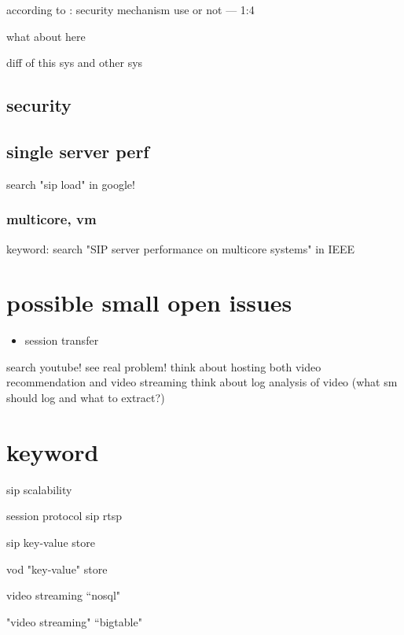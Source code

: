 \documentclass[•]{article}
\begin{document}
according to \cite{Nahum2007}:
security mechanism use or not — 1:4

what about here

diff of this sys and other sys

\subsection{security}

\subsection{single server perf}

search "sip load" in google!

\subsubsection{multicore, vm}
keyword: search "SIP server performance on multicore systems" in IEEE

\section{possible small open issues}
\begin{itemize}
\item session transfer
\end{itemize}

search youtube! see real problem!
think about hosting both video recommendation and video streaming
think about log analysis of video (what sm should log and what to extract?)



\section{keyword}

sip scalability

session protocol sip rtsp

sip key-value store

vod "key-value" store

video streaming “nosql"

"video streaming" “bigtable"





\cite{Nahum2007}\cite{Shen2010}\cite{Vaquero2011}\cite{Kim2011}\cite{Wang2010}\cite{Ohta2009}\cite{Hilt2008}\cite{Shen2008}\cite{Sisalem2011a}
\end{document}
